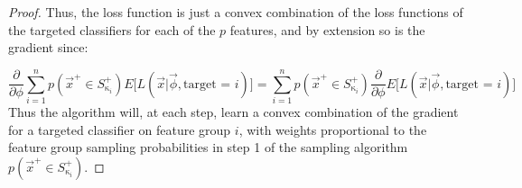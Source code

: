 \documentclass{article}
\newcommand{\vect}[1]{\vec{#1}}
\begin{document}
\begin{proof}
Thus, the loss function is just a convex combination  of the loss functions of the targeted classifiers for each of the $p$ features, and by extension so is the gradient since:

\[\frac{\partial }{\partial \phi}\sum_{i=1}^n p(\vect{x}^+ \in S^+_{\upkappa_i}) E\Big[ L(\vec{x} |\vec{\phi}, \text{target = $i$}) \Big] =
 \sum_{i=1}^n p(\vect{x}^+ \in S^+_{\upkappa_i}) \frac{\partial }{\partial \phi}E\Big[ L(\vec{x} |\vec{\phi}, \text{target = $i$}) \Big]\]
 Thus the algorithm will, at each step, learn a convex combination of the gradient for a targeted classifier on feature group $i$, with weights proportional to the feature group sampling probabilities in step 1 of the sampling algorithm $ p(\vect{x}^+ \in S^+_{\upkappa_i})$. 
\end{proof}
\end{document}
